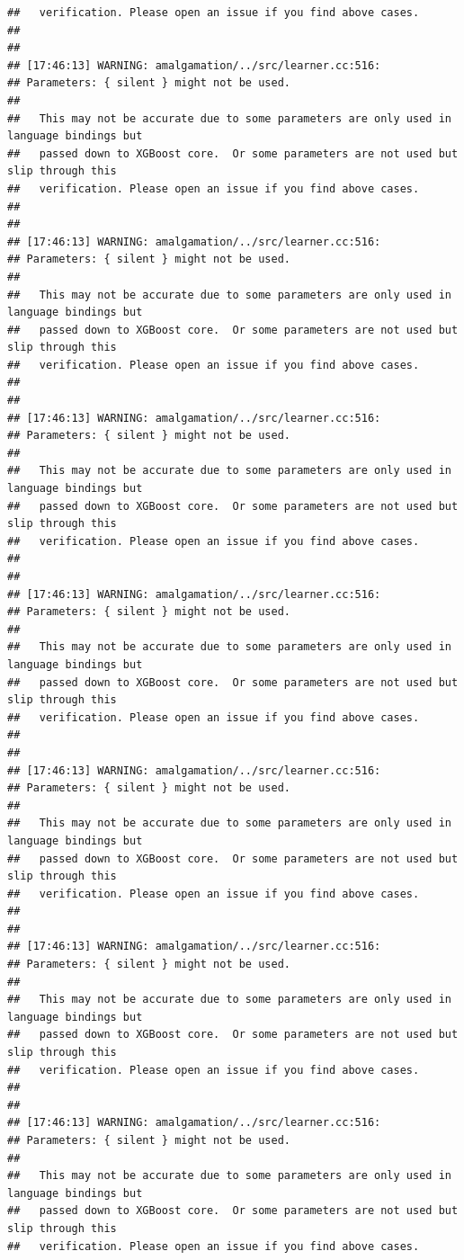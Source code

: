 \documentclass[AMS,STIX2COL]{WileyNJD-v2}\usepackage[]{graphicx}\usepackage[]{color}
\makeatletter
\newenvironment{kframe}{%
 \def\at@end@of@kframe{}%
 \ifinner\ifhmode%
  \def\at@end@of@kframe{\end{minipage}}%
  \begin{minipage}{\columnwidth}%
 \fi\fi%
 \def\FrameCommand##1{\hskip\@totalleftmargin \hskip-\fboxsep
 \colorbox{shadecolor}{##1}\hskip-\fboxsep
     \hskip-\linewidth \hskip-\@totalleftmargin \hskip\columnwidth}%
 \MakeFramed {\advance\hsize-\width
   \@totalleftmargin\z@ \linewidth\hsize
   \@setminipage}}%
 {\par\unskip\endMakeFramed%
 \at@end@of@kframe}
\newenvironment{knitrout}{}{} %
\makeatother
\begin{document}
\begin{knitrout}
\begin{kframe}
\begin{verbatim}
##   verification. Please open an issue if you find above cases.
## 
## 
## [17:46:13] WARNING: amalgamation/../src/learner.cc:516: 
## Parameters: { silent } might not be used.
## 
##   This may not be accurate due to some parameters are only used in language bindings but
##   passed down to XGBoost core.  Or some parameters are not used but slip through this
##   verification. Please open an issue if you find above cases.
## 
## 
## [17:46:13] WARNING: amalgamation/../src/learner.cc:516: 
## Parameters: { silent } might not be used.
## 
##   This may not be accurate due to some parameters are only used in language bindings but
##   passed down to XGBoost core.  Or some parameters are not used but slip through this
##   verification. Please open an issue if you find above cases.
## 
## 
## [17:46:13] WARNING: amalgamation/../src/learner.cc:516: 
## Parameters: { silent } might not be used.
## 
##   This may not be accurate due to some parameters are only used in language bindings but
##   passed down to XGBoost core.  Or some parameters are not used but slip through this
##   verification. Please open an issue if you find above cases.
## 
## 
## [17:46:13] WARNING: amalgamation/../src/learner.cc:516: 
## Parameters: { silent } might not be used.
## 
##   This may not be accurate due to some parameters are only used in language bindings but
##   passed down to XGBoost core.  Or some parameters are not used but slip through this
##   verification. Please open an issue if you find above cases.
## 
## 
## [17:46:13] WARNING: amalgamation/../src/learner.cc:516: 
## Parameters: { silent } might not be used.
## 
##   This may not be accurate due to some parameters are only used in language bindings but
##   passed down to XGBoost core.  Or some parameters are not used but slip through this
##   verification. Please open an issue if you find above cases.
## 
## 
## [17:46:13] WARNING: amalgamation/../src/learner.cc:516: 
## Parameters: { silent } might not be used.
## 
##   This may not be accurate due to some parameters are only used in language bindings but
##   passed down to XGBoost core.  Or some parameters are not used but slip through this
##   verification. Please open an issue if you find above cases.
## 
## 
## [17:46:13] WARNING: amalgamation/../src/learner.cc:516: 
## Parameters: { silent } might not be used.
## 
##   This may not be accurate due to some parameters are only used in language bindings but
##   passed down to XGBoost core.  Or some parameters are not used but slip through this
##   verification. Please open an issue if you find above cases.

\end{verbatim}
\end{kframe}
\end{knitrout}
\end{document}
